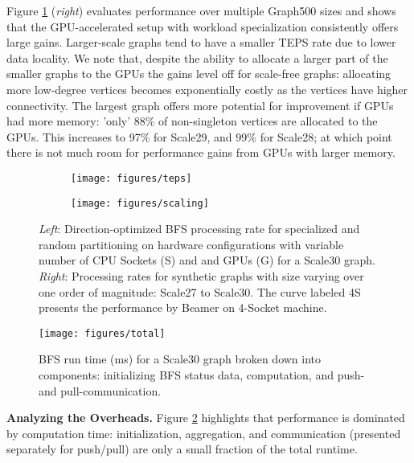 \documentclass{llncs}
\begin{document}
Figure \ref{fig:teps} (\textit{right}) evaluates performance over multiple Graph500 sizes and shows that the GPU-accelerated setup with workload specialization consistently offers large gains. Larger-scale graphs tend to have a smaller TEPS rate due to lower data locality. We note that, despite the ability to allocate a larger part of the smaller graphs to the GPUs the gains level off for scale-free graphs: allocating more low-degree vertices becomes exponentially costly as the vertices have higher connectivity. The largest graph offers more potential for improvement if GPUs had more memory: 'only' 88\% of non-singleton vertices are allocated to the GPUs. This increases to 97\% for Scale29, and 99\% for Scale28; at which point there is not much room for performance gains from GPUs with larger memory.
\begin{figure}\centering \begin{subfigure}{.5\textwidth}\centering \texttt{[image: figures/teps]}\end{subfigure}\begin{subfigure}{.5\textwidth}\centering \texttt{[image: figures/scaling]}\end{subfigure}\caption{\textit{Left}: Direction-optimized BFS processing rate for specialized and random partitioning on hardware configurations with variable number of CPU Sockets (S) and and GPUs (G) for a Scale30 graph. \textit{Right}: Processing rates for synthetic graphs with size varying over one order of magnitude: Scale27 to Scale30. The curve labeled 4S presents the performance by Beamer \cite{beamer2011searching} on 4-Socket machine.}\label{fig:teps}\end{figure}\begin{figure}\begin{center}\vspace{0cm}\texttt{[image: figures/total]}\caption{BFS run time (ms) for a Scale30 graph broken down into components: initializing BFS status data, computation, and push- and pull-communication.}\label{fig:total}\end{center}\end{figure}

\textbf{Analyzing the Overheads.} Figure \ref{fig:total} highlights that performance is dominated by computation time: initialization, aggregation, and communication (presented separately for push/pull) are only a small fraction of the total runtime.
\end{document}
